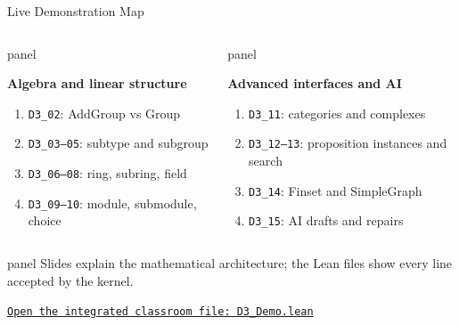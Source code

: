 \documentclass[aspectratio=169,10pt]{beamer}
\newcommand{\term}[1]{\textcolor{DOneBlue}{\textbf{#1}}}
\newenvironment{dpanel}{%
  \begin{beamercolorbox}[wd=\dimexpr\linewidth-9pt\relax,leftskip=0.15cm,rightskip=0.15cm plus1fil,rounded=true]{panel}%
  \setlength{\linewidth}{\hsize}%
  \vspace{0.10cm}%
}{\vspace{0.10cm}\end{beamercolorbox}}
\begin{document}
\begin{frame}[fragile]{Live Demonstration Map}
\begin{columns}[T,onlytextwidth]
\begin{dpanel}
\term{Algebra and linear structure}
\begin{enumerate}
  \item \texttt{D3\_02}: AddGroup vs Group
  \item \texttt{D3\_03--05}: subtype and subgroup
  \item \texttt{D3\_06--08}: ring, subring, field
  \item \texttt{D3\_09--10}: module, submodule, choice
\end{enumerate}
\end{dpanel}
\begin{dpanel}
\term{Advanced interfaces and AI}
\begin{enumerate}
  \item \texttt{D3\_11}: categories and complexes
  \item \texttt{D3\_12--13}: proposition instances and search
  \item \texttt{D3\_14}: Finset and SimpleGraph
  \item \texttt{D3\_15}: AI drafts and repairs
\end{enumerate}
\end{dpanel}
\end{columns}
\vspace{0.36cm}
\begin{dpanel}\centering
Slides explain the mathematical architecture; the Lean files show every line accepted by the kernel.
\end{dpanel}
\vspace{0.16cm}
\centering\href{run:D3_Demo.lean}{\textcolor{DOneBrightBlue}{\texttt{Open the integrated classroom file: D3\_Demo.lean}}}
\end{frame}
\end{document}
